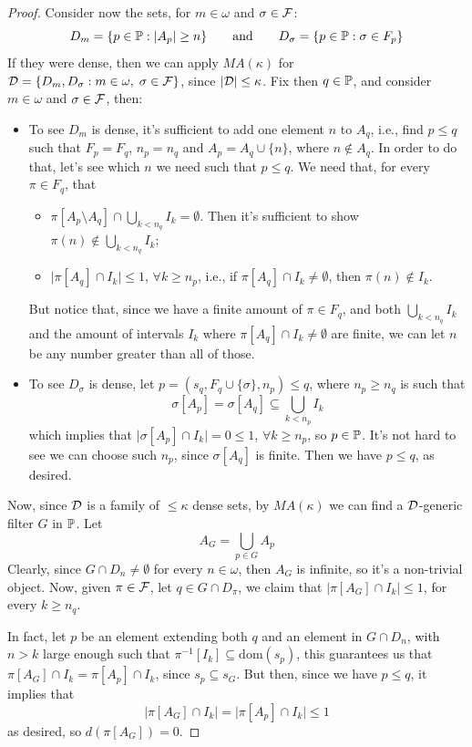\begin{proof}
    Consider now the sets, for $m\in\omega$ and $\sigma\in\mathcal{F}$:
    $$D_m=\{p\in\mathbb{P}:\lvert A_p\rvert\geq n\}\qquad\text{and}\qquad D_\sigma=\{p\in\mathbb{P}:\sigma\in F_p\}$$
    If they were dense, then we can apply $MA(\kappa)$ for $\mathcal{D}=\{D_m,D_\sigma:m\in\omega,\;\sigma\in\mathcal{F}\}$, since $\lvert\mathcal{D}\rvert\leq \kappa$. Fix then $q\in\mathbb{P}$, and consider $m\in\omega$ and $\sigma\in\mathcal{F}$, then:
    \begin{itemize}
        \item To see $D_m$ is dense, it's sufficient to add one element $n$ to $A_q$, i.e., find $p\leq q$ such that $F_p=F_q$, $n_p=n_q$ and $A_p=A_q\cup\{n\}$, where $n\notin A_q$. In order to do that, let's see which $n$ we need such that $p\leq q$. We need that, for every $\pi\in F_q$, that
        \begin{itemize}
            \item $\pi[A_p\setminus A_q]\cap\bigcup_{k<n_q}I_k=\emptyset$. Then it's sufficient to show $\pi(n)\notin\bigcup_{k<n_q}I_k$;
            \item $\lvert\pi[A_q]\cap I_k\rvert\leq 1$, $\forall k\geq n_p$, i.e., if $\pi[A_q]\cap I_k\neq\emptyset$, then $\pi(n)\notin I_k$.
        \end{itemize}
        But notice that, since we have a finite amount of $\pi\in F_q$, and both $\bigcup_{k<n_q}I_k$ and the amount of intervals $I_k$ where $\pi[A_q]\cap I_k\neq\emptyset$ are finite, we can let $n$ be any number greater than all of those.
        \item To see $D_\sigma$ is dense, let $p=(s_q, F_q \cup\{\sigma\}, n_p)\leq q$, where $n_p\geq n_q$ is such that
        $$\sigma[A_p]=\sigma[A_q]\subseteq\bigcup_{k<n_p}I_k$$
        which implies that $\lvert\sigma[A_p]\cap I_k\rvert=0\leq 1$, $\forall k\geq n_p$, so $p\in\mathbb{P}$. It's not hard to see we can choose such $n_p$, since $\sigma[A_q]$ is finite. Then we have $p\leq q$, as desired.
    \end{itemize}
    Now, since $\mathcal{D}$ is a family of $\leq\kappa$ dense sets, by $MA(\kappa)$ we can find a $\mathcal{D}$-generic filter $G$ in $\mathbb{P}$. Let
    $$A_G=\bigcup_{p\in G}A_p$$
    Clearly, since $G\cap D_n\neq\emptyset$ for every $n\in\omega$, then $A_G$ is infinite, so it's a non-trivial object. Now, given $\pi\in\mathcal{F}$, let $q\in G\cap D_\pi$, we claim that $\lvert\pi[A_G]\cap I_k\rvert\leq 1$, for every $k\geq n_q$.

    In fact, let $p$ be an element extending both $q$ and an element in $G\cap D_n$, with $n>k$ large enough such that $\pi^{-1}[I_k]\subseteq\text{dom}(s_p)$, this guarantees us that $\pi[A_G]\cap I_k=\pi[A_p]\cap I_k$, since $s_p\subseteq s_G$. But then, since we have $p\leq q$, it implies that
    $$\lvert\pi[A_G]\cap I_k\rvert=\lvert\pi[A_p]\cap I_k\rvert\leq 1$$
    as desired, so $d(\pi[A_G])=0$.
\end{proof}

